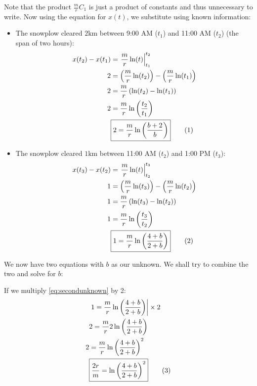 \documentclass[a4paper,12pt]{article}
\newcommand\numberthis{\addtocounter{equation}{1}\tag{\theequation}}
\begin{document}
    Note that the product $\frac{m}{r}C_1$ is just a product of constants and thus unnecessary to write.
    Now using the equation for $x(t)$, we substitute using known information:
    \begin{itemize}
        \item The snowplow cleared $2 \unit{\kilo\meter}$ between 9:00 AM ($t_1$) and 11:00 AM ($t_2$) (the span of two hours):
        \begin{align*}
            x(t_2) - x(t_1) &= \left.\frac{m}{r}\ln(t)\right|_{t_1}^{t_2}\\
            2 &= \left(\frac{m}{r} \ln(t_2)\right) - \left(\frac{m}{r}\ln(t_1)\right) \\
            2 &= \frac{m}{r} \left(\ln(t_2) - \ln(t_1)\right) \\
            2 &= \frac{m}{r} \ln\left(\frac{t_2}
            {t_1}\right) \\
            &\boxed{2 = \frac{m}{r} \ln\left(\frac{b+2}{b}\right)} \numberthis \label{eq:firstunknown}
        \end{align*}
        
        \item The snowplow cleared $1 \unit{\kilo\meter}$ between 11:00 AM ($t_2$) and 1:00 PM ($t_3$):
        \begin{align*}
            x(t_3) - x(t_2) &= \left.\frac{m}{r}\ln(t)\right|_{t_2}^{t_3} \\
            1 &= \left(\frac{m}{r} \ln(t_3)\right) - \left(\frac{m}{r}\ln(t_2)\right) \\
            1 &= \frac{m}{r} \left(\ln(t_3) - \ln(t_2)\right) \\
            1 &= \frac{m}{r} \ln\left(\frac{t_3}
            {t_2}\right) \\
            &\boxed{1 = \frac{m}{r} \ln\left(\frac{4+b}{2+b}\right)} \numberthis \label{eq:secondunknown}
        \end{align*}
    \end{itemize}

    We now have two equations with $b$ as our unknown. We shall try to combine the two and solve for $b$:

    If we multiply \eqref{eq:secondunknown} by 2:
    \begin{align*}
        &\left.1 = \frac{m}{r} \ln\left(\frac{4+b}{2+b}\right)\right|\times 2 \\
        &2 = \frac{m}{r} 2 \ln\left(\frac{4+b}{2+b}\right) \\
        2 &= \frac{m}{r} \ln\left(\frac{4+b}{2+b}\right)^2 \\
        &\boxed{\frac{2r}{m} = \ln\left(\frac{4+b}{2+b}\right)^2} \label{eq:thirdunknown} \numberthis
    \end{align*}
\end{document}
